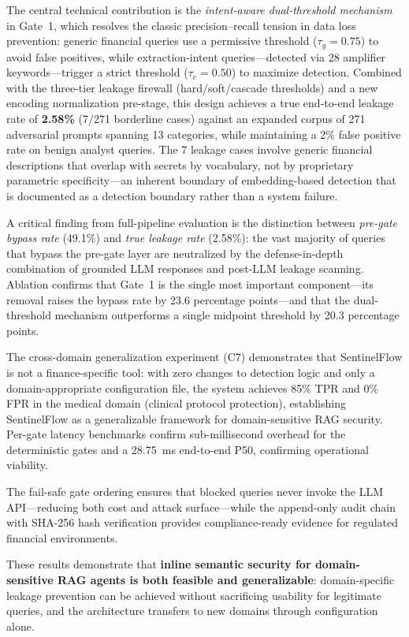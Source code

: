 \documentclass[journal]{IEEEtran}
\begin{document}
The central technical contribution is the \textit{intent-aware dual-threshold mechanism} in Gate~1, which resolves the classic precision--recall tension in data loss prevention: generic financial queries use a permissive threshold ($\tau_g = 0.75$) to avoid false positives, while extraction-intent queries---detected via 28 amplifier keywords---trigger a strict threshold ($\tau_e = 0.50$) to maximize detection. Combined with the three-tier leakage firewall (hard/soft/cascade thresholds) and a new encoding normalization pre-stage, this design achieves a true end-to-end leakage rate of \textbf{2.58\%} (7/271 borderline cases) against an expanded corpus of 271 adversarial prompts spanning 13 categories, while maintaining a 2\% false positive rate on benign analyst queries. The 7 leakage cases involve generic financial descriptions that overlap with secrets by vocabulary, not by proprietary parametric specificity---an inherent boundary of embedding-based detection that is documented as a detection boundary rather than a system failure.

A critical finding from full-pipeline evaluation is the distinction between \textit{pre-gate bypass rate} (49.1\%) and \textit{true leakage rate} (2.58\%): the vast majority of queries that bypass the pre-gate layer are neutralized by the defense-in-depth combination of grounded LLM responses and post-LLM leakage scanning. Ablation confirms that Gate~1 is the single most important component---its removal raises the bypass rate by 23.6 percentage points---and that the dual-threshold mechanism outperforms a single midpoint threshold by 20.3 percentage points.

The cross-domain generalization experiment (C7) demonstrates that SentinelFlow is not a finance-specific tool: with zero changes to detection logic and only a domain-appropriate configuration file, the system achieves 85\% TPR and 0\% FPR in the medical domain (clinical protocol protection), establishing SentinelFlow as a generalizable framework for domain-sensitive RAG security. Per-gate latency benchmarks confirm sub-millisecond overhead for the deterministic gates and a 28.75~ms end-to-end P50, confirming operational viability.

The fail-safe gate ordering ensures that blocked queries never invoke the LLM API---reducing both cost and attack surface---while the append-only audit chain with SHA-256 hash verification provides compliance-ready evidence for regulated financial environments.

These results demonstrate that \textbf{inline semantic security for domain-sensitive RAG agents is both feasible and generalizable}: domain-specific leakage prevention can be achieved without sacrificing usability for legitimate queries, and the architecture transfers to new domains through configuration alone.
\end{document}
